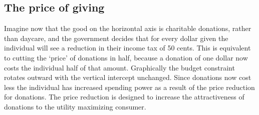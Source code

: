 \subsection*{The price of giving}

Imagine now that the good on the horizontal axis is charitable donations, rather than daycare, and the government decides that for every dollar given the individual will see a reduction in their income tax of 50 cents. This is equivalent to cutting the `price' of donations in half, because a donation of one dollar now costs the individual half of that amount. Graphically the budget constraint rotates outward with the vertical intercept unchanged. Since donations now cost less the individual has increased spending power as a result of the price reduction for donations. The price reduction is designed to increase the attractiveness of donations to the utility maximizing consumer.
